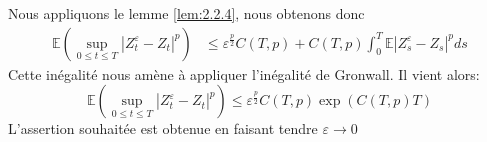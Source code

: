 \documentclass[12pt,a4paper,twoside,fleqn]{book}%
\theoremstyle{definition}
\theoremstyle{lemme}
\numberwithin{equation}{section}
\begin{document}
Nous appliquons le lemme \ref{lem:2.2.4}, nous obtenons donc
\[
\begin{aligned}
\mathbb{E}\left(\sup_{0\leq t \leq T}|Z_t^\varepsilon - Z_t|^p \right)&\leq \varepsilon^{\frac{p}{2}} C(T,p) + C(T,p)\int_{0}^{T}\mathbb{E}|Z_s^\varepsilon-Z_s|^pds
\end{aligned}
\]
Cette inégalité nous amène à appliquer l'inégalité de Gronwall. Il vient alors:
\[
\mathbb{E}\left(\sup_{0\leq t \leq T}|Z_t^\varepsilon - Z_t|^p \right)\leq \varepsilon^{\frac{p}{2}} C(T,p) \exp\left(C(T,p)T\right)
\]
 L’assertion souhaitée est obtenue en faisant tendre $\varepsilon\to0$
\end{document}
